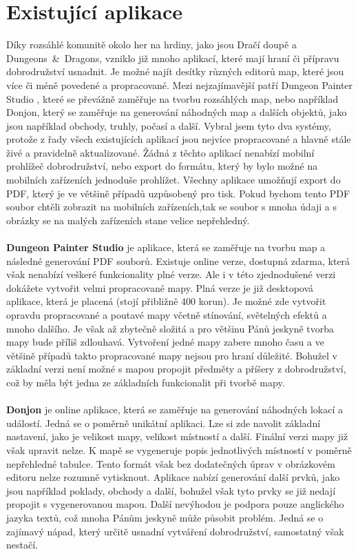 \documentclass[thesis=B,czech]{resources/FITthesis}[2012/06/26]
\begin{document}
	\section{Existující aplikace}
Díky rozsáhlé komunitě okolo her na hrdiny, jako jsou Dračí doupě a Dungeons~\&~Dragons, vzniklo již mnoho aplikací, které mají hraní či přípravu dobrodružství usnadnit. Je možné najít desítky různých editorů map, které jsou více či méně povedené a propracované. Mezi nejzajímavější patří  Dungeon Painter Studio \cite{dungeoPainterStudio}, které se převážně zaměřuje na tvorbu rozsáhlých map, nebo například Donjon\cite{donjon}, který se zaměřuje na generování náhodných map a dalších objektů, jako jsou například obchody, truhly, počasí a další. Vybral jsem tyto dva systémy, protože z řady všech existujících aplikací jsou nejvíce propracované a hlavně stále živé a pravidelně aktualizované. Žádná z těchto aplikací nenabízí mobilní prohlížeč dobrodružství, nebo export do formátu, který by bylo možné na mobilních zařízeních jednoduše prohlížet. Všechny aplikace umožňují export do PDF, který je ve většině případů uzpůsobený pro tisk. Pokud bychom tento PDF soubor chtěli zobrazit na mobilních zařízeních,tak se  soubor s mnoha údaji a s obrázky se na malých zařízeních stane velice nepřehledný. \\
\\
\textbf{Dungeon Painter Studio} je aplikace, která se zaměřuje na tvorbu map a následné generování PDF souborů. Existuje online verze, dostupná zdarma, která však nenabízí veškeré funkcionality plné verze. Ale i v této zjednodušené verzi dokážete vytvořit velmi propracované mapy. Plná verze je již desktopová aplikace, která je placená (stojí  přibližně 400 korun). Je možné zde vytvořit opravdu propracované a poutavé mapy včetně stínování, světelných efektů a mnoho dalšího. Je však až zbytečně složitá a pro většinu Pánů jeskyně tvorba mapy bude příliš zdlouhavá. Vytvoření jedné mapy zabere mnoho času a ve většině případů takto propracované mapy nejsou pro hraní důležité. Bohužel v základní verzi není možné s mapou propojit předměty a příšery z dobrodružství, což by měla být jedna ze základních funkcionalit při tvorbě mapy.\\
\\
\textbf{Donjon} je online aplikace, která se zaměřuje na generování náhodných lokací a událostí. Jedná se o poměrně unikátní aplikaci. Lze si zde navolit základní nastavení, jako je velikost mapy, velikost místností a další. Finální verzi mapy již však upravit nelze. K mapě se vygeneruje popis jednotlivých místností v poměrně nepřehledné tabulce. Tento formát však bez dodatečných úprav v obrázkovém editoru nelze rozumně vytisknout. Aplikace nabízí generování další prvků, jako jsou například poklady, obchody a další, bohužel však tyto prvky se již nedají propojit s vygenerovanou mapou. Další nevýhodou je podpora pouze anglického jazyka textů, což mnoha Pánům jeskyně může působit problém. Jedná se o zajímavý nápad, který určitě usnadní vytváření dobrodružství, samostatný však nestačí.
\end{document}
